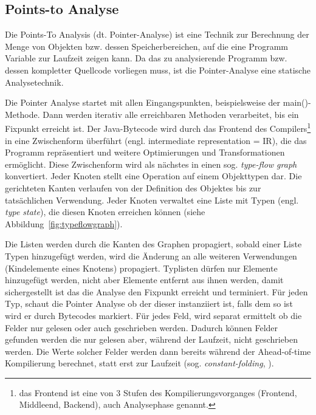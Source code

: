 \subsection{Points-to Analyse}
\label{subsec:pointsto}

Die Points-To Analysis (dt. Pointer-Analyse) ist eine Technik zur Berechnung der Menge von Objekten bzw. dessen Speicherbereichen, auf die eine Programm Variable zur Laufzeit zeigen kann\cite{Hind2001, Smaragdakis2015}. Da das zu analysierende Programm bzw. dessen kompletter Quellcode vorliegen muss, ist die Pointer-Analyse eine statische Analysetechnik.

Die Pointer Analyse startet mit allen Eingangspunkten, beispielsweise der main()-Methode. Dann werden iterativ alle erreichbaren Methoden verarbeitet, bis ein Fixpunkt erreicht ist. Der Java-Bytecode wird durch das Frontend des Compilers\footnote{das Frontend ist eine von 3 Stufen des Kompilierungsvorganges (Frontend, Middleend, Backend), auch Analysephase genannt. } in eine Zwischenform überführt (engl. intermediate representation = IR), die das Programm repräsentiert und weitere Optimierungen und Transformationen ermöglicht\cite{Simon2015}. 
Diese Zwischenform wird als nächstes in einen sog. \textit{type-flow graph} konvertiert. Jeder Knoten stellt eine Operation auf einem Objekttypen dar. Die gerichteten Kanten verlaufen von der Definition des Objektes bis zur tatsächlichen Verwendung. Jeder Knoten verwaltet eine Liste mit Typen (engl. \textit{type state}), die diesen Knoten erreichen können (siehe Abbildung~\ref{fig:typeflowgraph}). 

Die Listen werden durch die Kanten des Graphen propagiert, sobald einer Liste Typen hinzugefügt werden, wird die Änderung an alle weiteren Verwendungen (Kindelemente eines Knotens) propagiert. Typlisten dürfen nur Elemente hinzugefügt werden, nicht aber Elemente entfernt aus ihnen werden, damit sichergestellt ist das die Analyse den Fixpunkt erreicht und terminiert. Für jeden Typ, schaut die Pointer Analyse ob der dieser instanziiert ist, falls dem so ist wird er durch Bytecodes markiert. Für jedes Feld, wird separat ermittelt ob die Felder nur gelesen oder auch geschrieben werden. Dadurch können Felder gefunden werden die nur gelesen aber, während der Laufzeit, nicht geschrieben werden. Die Werte solcher Felder werden dann bereits während der Ahead-of-time Kompilierung berechnet, statt erst zur Laufzeit (sog. \textit{constant-folding}, \cite[Kapitel 4.2]{Grumberg2014}).
 

